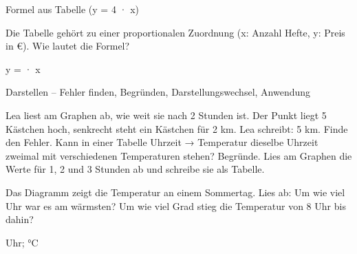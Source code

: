 \begin{aufgabe}{Formel aus Tabelle (y = 4 · x)}
\begin{teile}
\teil Die Tabelle gehört zu einer proportionalen Zuordnung (x: Anzahl Hefte, y: Preis in €). Wie lautet die Formel?

y = \leerfeld · x
\end{teile}
\end{aufgabe}

\begin{aufgabe}{Darstellen – Fehler finden, Begründen, Darstellungswechsel, Anwendung}
\begin{teile}
\teil Lea liest am Graphen ab, wie weit sie nach 2 Stunden ist. Der Punkt liegt 5 Kästchen hoch, senkrecht steht ein Kästchen für 2 km. Lea schreibt: 5 km. Finde den Fehler.
\teil Kann in einer Tabelle Uhrzeit → Temperatur dieselbe Uhrzeit zweimal mit verschiedenen Temperaturen stehen? Begründe.
\teil Lies am Graphen die Werte für 1, 2 und 3 Stunden ab und schreibe sie als Tabelle.

\begin{ksys}[xmin=0,xmax=4,ymin=0,ymax=6,ablesen,xlabel=Zeit in h,ylabel=Regen in mm]\end{ksys}
\teil Das Diagramm zeigt die Temperatur an einem Sommertag. Lies ab: Um wie viel Uhr war es am wärmsten? Um wie viel Grad stieg die Temperatur von 8 Uhr bis dahin?

\leerfeld Uhr; \leerfeld °C
\end{teile}
\end{aufgabe}
